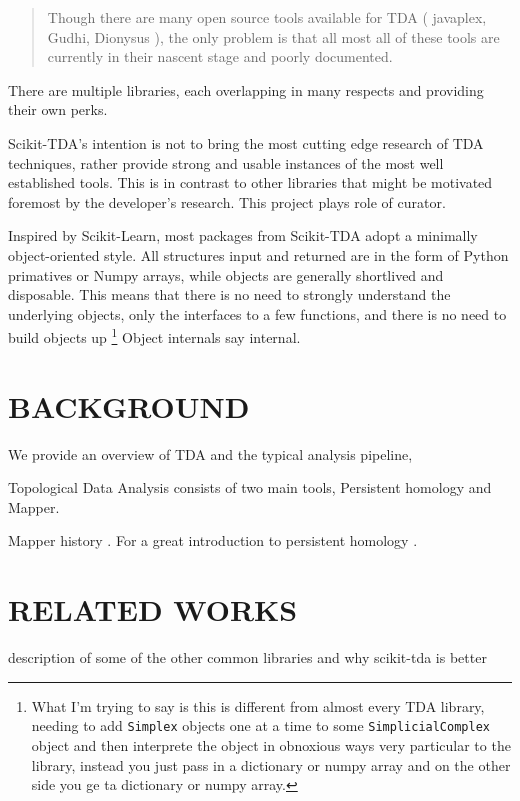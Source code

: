\documentclass[letterpaper, 10 pt, conference]{ieeeconf}  %
\begin{document}
\begin{quote}
    Though there are many open source tools available for TDA ( javaplex, Gudhi, Dionysus ), the only problem is that all most all of these tools are currently in their nascent stage and poorly documented. 
\end{quote}

There are multiple libraries, each overlapping in many respects and providing their own perks. 

Scikit-TDA's intention is not to bring the most cutting edge research of TDA techniques, rather provide strong and usable instances of the most well established tools. This is in contrast to other libraries that might be motivated foremost by the developer's research. This project plays role of curator.

Inspired by Scikit-Learn, most packages from Scikit-TDA adopt a minimally object-oriented style. All structures input and returned are in the form of Python primatives or Numpy arrays, while objects are generally shortlived and disposable. This means that there is no need to strongly understand the underlying objects, only the interfaces to a few functions, and there is no need to build objects up \footnote{What I'm trying to say is this is different from almost every TDA library, needing to add \texttt{Simplex} objects one at a time to some \texttt{SimplicialComplex} object and then interprete the object in obnoxious ways very particular to the library, instead you just pass in a dictionary or numpy array and on the other side you ge ta dictionary or numpy array.} Object internals say internal.


\section{BACKGROUND}


We provide an overview of TDA and the typical analysis pipeline,



Topological Data Analysis consists of two main tools, Persistent homology and Mapper.

Mapper history \cite{singh2007topological}.
For a great introduction to persistent homology \cite{ghrist2008barcodes}.


\section{RELATED WORKS}
description of some of the other common libraries and why scikit-tda is better
\end{document}
